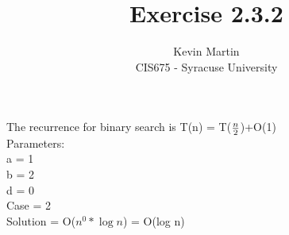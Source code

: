 \documentclass{article}
\author{Kevin Martin\\ CIS675 - Syracuse University}
\title{Exercise 2.3.2}
\begin{document}
\maketitle

The recurrence for binary search is T(n) = T(\(n\over 2\))+O(1) \\
Parameters:\\
a = 1\\
b = 2\\
d = 0\\
Case = 2\\
Solution = O(\(n^0*\log n\)) = O(log n)\\
\end{document}
